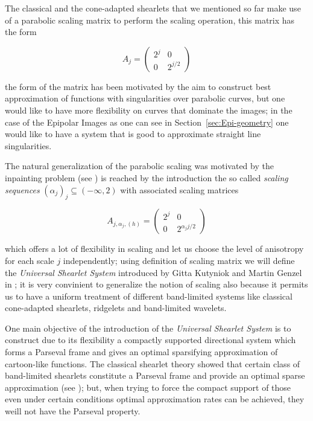 The classical and the cone-adapted shearlets that we mentioned so far make use of a parabolic scaling matrix to perform the scaling operation, this matrix has the form 

\begin{equation}
\label{eq:parabolic_scaling}
A_j=\left(
\begin{matrix}
2^j & 0 \\
0 & 2^{j/2}
\end{matrix}
\right)
\end{equation}

the form of the matrix has been motivated by the aim to construct best approximation of functions with singularities over parabolic curves, but one would like to have more flexibility on curves that dominate the images; in the case of the Epipolar Images as one can see in Section~\ref{sec:Epi-geometry} one would like to have a system that is good to approximate straight line singularities. 

\bigskip

The natural generalization of the parabolic scaling was motivated by the inpainting problem (see \cite{Gitta-alpha}) is reached by the introduction the so called \textit{scaling sequences} $(\alpha_j)_j\subseteq (-\infty,2)$ with associated scaling matrices

\begin{equation}
\label{eq:alpha_scaling}
A_{j,\alpha_j,(h)}=\left(
\begin{matrix}
2^j & 0 \\
0 & 2^{\alpha_j j/2}
\end{matrix}
\right)
\end{equation}

which offers a lot of flexibility in scaling and let us choose the level of anisotropy for each scale $j$ independently; using definition of scaling matrix we will define the \textit{Universal Shearlet System} introduced by Gitta Kutyniok and Martin Genzel in \cite{Gitta-alpha}; it is very convinient to generalize the notion of scaling also because it permits us to have a uniform treatment of different band-limited systems like classical cone-adapted shearlets, ridgelets and band-limited wavelets. 

\bigskip

One main objective of the introduction of the \textit{Universal Shearlet System} is to construct due to its flexibility a compactly supported directional system which forms a Parseval frame and gives an optimal sparsifying approximation of cartoon-like functions. The classical shearlet theory showed that certain class of band-limited shearlets constitute a Parseval frame and provide an optimal sparse approximation (see \cite{Guo-Labate}); but, when trying to force the compact support of those even under certain conditions optimal approximation rates can be achieved, they weill not have the Parseval property. 

